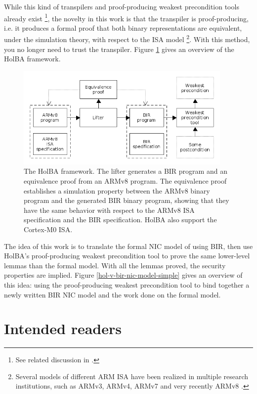 \documentclass{kththesis}
\begin{document}
While this kind of \glspl{transpiler} and \gls{proof-producing}
weakest precondition tools already exist \footnote{See related discussion in \cite{lindner_trabin:_2019}.}, the novelty in this work is that the transpiler is proof-producing, i.e. it produces a formal proof that both binary representations are equivalent, under the simulation theory, with respect to the \gls{ISA} model \footnote{Several models of different ARM \gls{ISA} have been realized in multiple research institutions, such as ARMv3, ARMv4, ARMv7 \cite{noauthor_canonical_2019, hutchison_trustworthy_2010} and very recently ARMv8 \cite{armstrong_isa_2019}.}. With this method, you no longer need to trust the transpiler. Figure \ref{holba-overview} gives an overview of the HolBA framework.

\begin{figure}[ht]
	\includegraphics[height=5cm]{figures/holba-overview.png}
	\centering
	\caption{The HolBA framework. The lifter generates a BIR program and an equivalence proof from an ARMv8 program. The equivalence proof establishes a simulation property between the ARMv8 binary program and the generated BIR binary program, showing that they have the same behavior with respect to the ARMv8 \gls{ISA} specification and the BIR specification. HolBA also support the Cortex-M0 ISA.}
	\label{holba-overview}
\end{figure}

The idea of this work is to translate the formal \gls{NIC} model of \cite{haglund_formal_2016} using \gls{BIR}, then use HolBA's proof-producing weakest precondition tool to prove the same lower-level lemmas than the formal model. With all the lemmas proved, the security properties are implied. Figure \ref{hol-v-bir-nic-model-simple} gives an overview of this idea: using the proof-producing weakest precondition tool to bind together a newly written BIR NIC model and the work done on the formal model.

\section{Intended readers}
\end{document}
